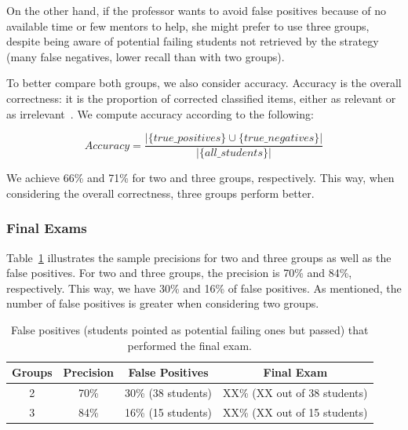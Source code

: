 On the other hand, if the professor wants to avoid false positives because of no available time or few mentors to help, she might prefer to use three groups, despite being aware of potential failing students not retrieved by the strategy (many false negatives, lower recall than with two groups). 

To better compare both groups, we also consider accuracy. Accuracy is the overall correctness: it is the proportion of corrected classified items, either as relevant or as irrelevant~\cite{evaluation-text}. We compute accuracy according to the following:

\vspace{0.1cm}
$$
Accuracy = \frac{| \{true\_positives\} \cup \{true\_negatives\} |}{| \{all\_students\} |}
$$
\vspace{0.1cm}

We achieve 66\% and 71\% for two and three groups, respectively. This way, when considering the overall correctness, three groups perform better.

\subsubsection{Final Exams}




Table~\ref{tab:final-exams} illustrates the sample precisions for two and three groups as well as the false positives. For two and three groups, the precision is 70\% and 84\%, respectively. This way, we have 30\% and 16\% of false positives. As mentioned, the number of false positives is greater when considering two groups.

\begin{table}[h]
\centering
\begin{tabular}{|c|c|c|c|}
\hline
\textbf{Groups} & \textbf{Precision} & \textbf{False Positives} & \textbf{Final Exam}\\ \hline
2 & 70\% & 30\% (38 students) & XX\% (XX out of 38 students)\\ \hline
3 & 84\% & 16\% (15 students) & XX\% (XX out of 15 students)\\ \hline
\end{tabular}
\caption{False positives (students pointed as potential failing ones but passed) that performed the final exam.}
\label{tab:final-exams}
\end{table}


